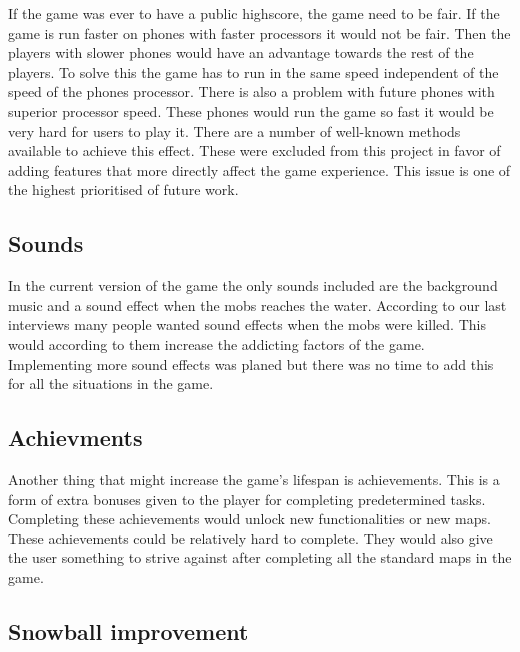 If the game was ever to have a public highscore, the game need to be fair. If the game is run faster on phones with faster processors it would not be fair. Then the players with slower phones would have an advantage towards the rest of the players. To solve this the game has to run in the same speed independent of the speed of the phones processor. There is also a problem with future phones with superior processor speed. These phones would run the game so fast it would be very hard for users to play it. There are a number of well-known methods available to achieve this effect. These were excluded from this project in favor of adding features that more directly affect the game experience. This issue is one of the highest prioritised of future work. 
\subsection{Sounds}

In the current version of the game the only sounds included are the background music and a sound effect when the mobs reaches the water. According to our last interviews many people wanted sound effects when the mobs were killed. This would according to them increase the addicting factors of the game. Implementing more sound effects was planed but there was no time to add this for all the situations in the game.
\subsection{Achievments}

Another thing that might increase the game's lifespan is achievements. This is a form of extra bonuses given to the player for completing predetermined tasks. Completing these achievements would unlock new functionalities or new maps. These achievements could be relatively hard to complete. They would also give the user something to strive against after completing all the standard maps in the game.
\subsection{Snowball improvement}

